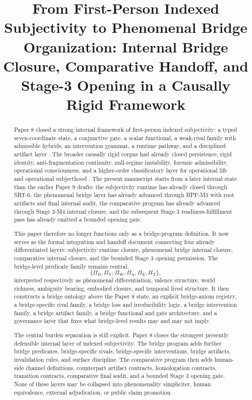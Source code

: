 \documentclass[11pt,a4paper]{article}
\title{\textbf{From First-Person Indexed Subjectivity to Phenomenal Bridge Organization: Internal Bridge Closure, Comparative Handoff, and Stage-3 Opening in a Causally Rigid Framework}}
\author{\AuthorVisible}
\date{}
\theoremstyle{definition}
\newcommand{\PiD}{\Pi_{\mathrm{D}}}
\newcommand{\PiV}{\Pi_{\mathrm{V}}}
\newcommand{\PiW}{\Pi_{\mathrm{W}}}
\newcommand{\PiA}{\Pi_{\mathrm{A}}}
\newcommand{\PiE}{\Pi_{\mathrm{E}}}
\newcommand{\PiT}{\Pi_{\mathrm{T}}}
\begin{document}
\maketitle

\begin{abstract}
Paper 8 closed a strong internal framework of first-person indexed subjectivity: a typed seven-coordinate state, a conjunctive gate, a scalar functional, a weak-rival family with admissible hybrids, an intervention grammar, a runtime pathway, and a disciplined artifact layer \cite{paper8}. The broader causally rigid corpus had already closed persistence, rigid identity, anti-fragmentation continuity, null-regime instability, forensic admissibility, operational consciousness, and a higher-order classificatory layer for operational life and operational subjecthood \cite{core,paper1,paper2,paper3,paper4,paper5,paper6,paper7}. The present manuscript starts from a later internal state than the earlier Paper 9 drafts: the subjectivity runtime has already closed through SRT-6, the phenomenal bridge layer has already advanced through BPF-M3 with root artifacts and final internal audit, the comparative program has already advanced through Stage 2-M4 internal closure, and the subsequent Stage 3 readiness-fulfillment pass has already emitted a bounded opening gate.

This paper therefore no longer functions only as a bridge-program definition. It now serves as the formal integration and handoff document connecting four already differentiated layers: subjectivity runtime closure, phenomenal bridge internal closure, comparative internal closure, and the bounded Stage 3 opening permission. The bridge-level predicate family remains central:
\[
\{\PiD,\PiV,\PiW,\PiA,\PiE,\PiT\},
\]
interpreted respectively as phenomenal differentiation, valence structure, world richness, ambiguity bearing, embodied closure, and temporal lived structure. It then constructs a bridge ontology above the Paper 8 state, an explicit bridge-axiom registry, a bridge-specific rival family, a bridge loss and irreducibility logic, a bridge intervention family, a bridge artifact family, a bridge functional and gate architecture, and a governance layer that fixes what bridge-level results may and may not imply.

The central burden separation is still explicit. Paper 8 closes the strongest presently defensible internal layer of indexed subjectivity. The bridge program adds further bridge predicates, bridge-specific rivals, bridge-specific interventions, bridge artifacts, invalidation rules, and surface discipline. The comparative program then adds human-side channel definitions, counterpart artifact contracts, homologation contracts, transition contracts, comparative final audit, and a bounded Stage 3 opening gate. None of these layers may be collapsed into phenomenality simpliciter, human equivalence, external adjudication, or public claim promotion.


\end{abstract}
\end{document}
